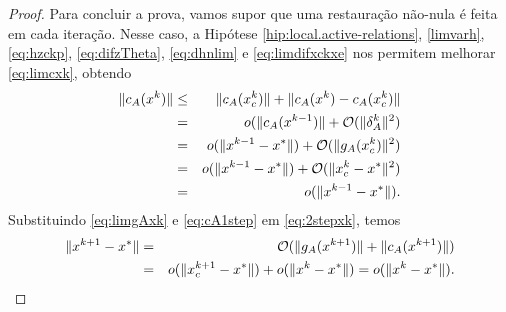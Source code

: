 \begin{proof}
Para concluir a prova, vamos supor que uma restauração não-nula é feita em cada
iteração. Nesse caso, 
a Hipótese \ref{hip:local.active-relations}, \eqref{limvarh}, \eqref{eq:hzckp},
 \eqref{eq:difzTheta}, \eqref{eq:dhnlim} e 
\eqref{eq:limdifxckxe} nos permitem melhorar \eqref{eq:limcxk}, obtendo
\begin{eqnarray}
 \norma{c_A(x^k)} & \leq & \norma{c_A(\xc{k})} + \norma{c_A(x^k) - c_A(\xc{k})} \nonumber \\
 & = & o(\norma{c_A(x^{k-1})} + \bigo(\norma{\delta_A^k}^2) \nonumber \\
 & = & o(\norma{x^{k-1} - x^*}) + \bigo(\norma{g_A(\xc{k})}^2) \nonumber \\
 & = & o(\norma{x^{k-1} - x^*}) + \bigo(\norma{\xc{k} - x^*}^2) \nonumber \\
 & = & o(\norma{x^{k-1} - x^*}). \visiblelbl{eq:cA1step}
\end{eqnarray}
Substituindo \eqref{eq:limgAxk} e \eqref{eq:cA1step} em \eqref{eq:2stepxk}, temos
\begin{eqnarray*}
 \Vert x^{k+1} - x^*\Vert & = & \mathcal{O}(\Vert g_A(x^{k+1})\Vert + \Vert c_A(x^{k+1})\Vert) \nonumber \\
 & = & o(\Vert x_c^{k+1} - x^*\Vert) + o(\Vert x^k - x^*\Vert) = o(\Vert x^k - x^*\Vert).
\end{eqnarray*}
\end{proof}
